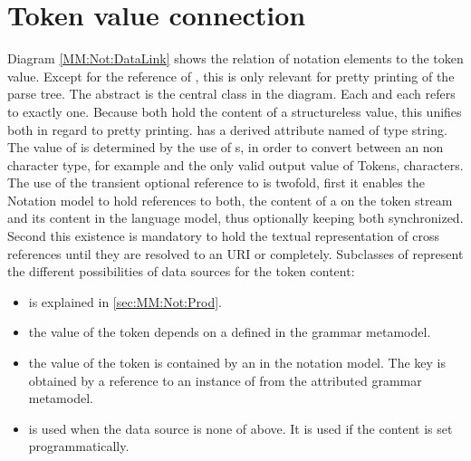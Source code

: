\section{Token value connection}
Diagram \ref{MM:Not:DataLink} shows the relation of notation elements to the token value. Except for the  reference of , this is only relevant for pretty printing of the parse tree. The abstract  is the central class in the diagram. Each  and each  refers to exactly one. Because both hold the content of a structureless value, this unifies both in regard to pretty printing.  has a derived attribute named  of type string. The value of  is determined by the use of s, in order to convert between an non character type, for example  and the only valid output value of Tokens, characters. The use of the transient optional reference to  is twofold, first it enables the Notation model to hold references to both, the content of a  on the token stream and its content in the language model, thus optionally keeping both synchronized. Second this existence is mandatory to hold the textual representation of cross references until they are resolved to an URI or completely. Subclasses of  represent the different possibilities of data sources for the token content:
\begin{itemize}
	\item {} is explained in \ref{sec:MM:Not:Prod}.
	\item {} the value of the token depends on a   defined in the grammar metamodel.
	\item {} the value of the token is contained by an  in the notation model. The key is obtained by a reference to an instance of  from the  attributed grammar metamodel.
	\item {} is used when the data source is none of above. It is used if the content is set programmatically.
\end{itemize}


